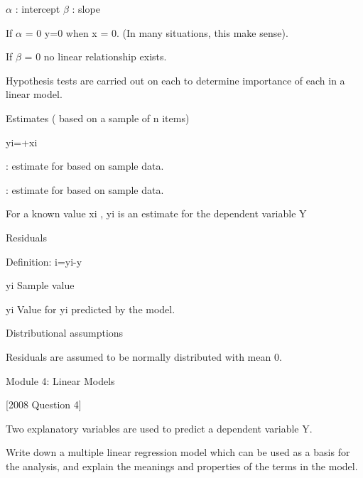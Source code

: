  $\alpha$ : intercept       $\beta$      : slope

 

If $\alpha$ = 0     y=0 when x = 0. (In many situations, this make sense).

 

If $\beta$  = 0     no linear relationship exists.

 

Hypothesis tests are carried out on each to determine importance of each in a linear model.

 

Estimates ( based on a sample of n items)

 

yi=+xi

 

 : estimate for  based on sample data.

 

 : estimate for  based on sample data.

 

 For a known value xi , yi is an estimate for the dependent variable Y 

 



Residuals

 

Definition:    i=yi-y

 

yi   Sample value

 

yi  Value for yi predicted by the model.

 

  

Distributional assumptions

 

Residuals are assumed to be normally distributed with mean 0. 

 

 

 

 Module 4: Linear Models


[2008 Question 4]

Two explanatory variables are used to predict a dependent variable Y.

 

Write down a multiple linear regression model which can be used as a basis for the analysis, and explain the meanings and properties of the terms in the model.

